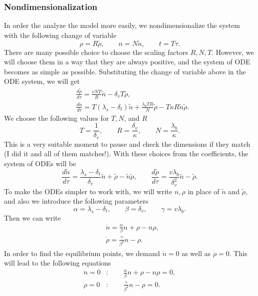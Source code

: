 \subsubsection*{Nondimensionalization}
In order the analyze the model more easily, we nondimensionalize the system with the following change of variable
\[ \rho = R \tilde{\rho}, \qquad n = N \tilde{n}, \qquad t = T \tau. \]
There are many possible choice to choose the scaling factors $R, N, T$. However, we will choose them in a way that they are always positive, and the system of ODE becomes as simple as possible. Substituting the change of variable above in the ODE system, we will get
\begin{align*}
	&\frac{d\tilde{\rho}}{d\tau} = \frac{vNT}{R}\tilde{n} - \delta_v T \tilde{\rho},\\
	&\frac{d\tilde{n}}{d\tau} = T(\lambda_s-\delta_t)\tilde{n} + \frac{\lambda_b T R}{N} \tilde{\rho} - T\kappa R \tilde{n}\tilde{\rho}. \tag{\twonotes}
\end{align*}
We choose the following values for $T,N$, and $R$
\[ T = \frac{1}{\delta_v}, \qquad R = \frac{\delta_v}{\kappa}, \qquad N = \frac{\lambda_b}{\kappa}. \]
This is a very suitable moment to pause and check the dimensions if they match (I did it and all of them matches!). With these choices from the coefficients, the system of ODEs will be
\[ \frac{d\tilde{n}}{d \tau} = \frac{\lambda_s - \delta_t}{\delta_v} \tilde{n} + \tilde{\rho} - \tilde{n}\tilde{\rho}, \qquad
\frac{d\tilde{\rho}}{d\tau} = \frac{v\lambda_b}{\delta_v^2}\tilde{n} - \tilde{\rho}. \]
To make the ODEs simpler to work with, we will write $n,\rho$ in place of $\tilde{n}$ and $\tilde{\rho}$, and also we introduce the following parameters
\[ \alpha = \lambda_s - \delta_t, \qquad \beta =\delta_v, \qquad \gamma = v\lambda_b. \tag{$\clubsuit$} \]
Then we can write
\begin{equation*}
	\boxed{
		\begin{aligned}
			&\dot{n} = \frac{\alpha}{\beta}n + \rho - n\rho, \\
			&\dot{\rho} = \frac{\gamma}{\beta^2}n -\rho.
		\end{aligned}
	}
	\tag{\smiley}
\end{equation*}
In order to find the equilibrium points, we demand $\dot{n} = 0$ as well as $\dot{\rho} = 0$. This will lead to the following equations
\begin{align*}
	\dot{n} = 0&: \qquad \frac{\alpha}{\beta} n + \rho - n\rho = 0, \\
	\dot{\rho} =0&: \qquad \frac{\gamma}{\beta^2}n - \rho = 0.
\end{align*}
